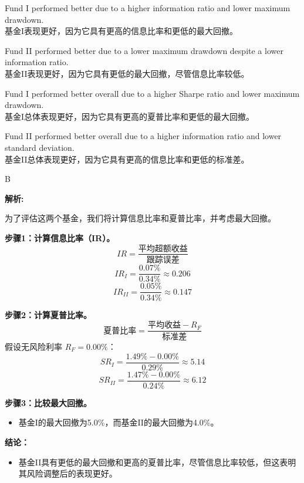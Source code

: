 \documentclass{article}
\newenvironment{explanation}
{\textbf{解析:}\par}
{\par}
\begin{document}
\begin{choices}
    \item Fund I performed better due to a higher information ratio and lower maximum drawdown.
    \\
    基金I表现更好，因为它具有更高的信息比率和更低的最大回撤。
    \item Fund II performed better due to a lower maximum drawdown despite a lower information ratio.
    \\
    基金II表现更好，因为它具有更低的最大回撤，尽管信息比率较低。
    \item Fund I performed better overall due to a higher Sharpe ratio and lower maximum drawdown.
    \\
    基金I总体表现更好，因为它具有更高的夏普比率和更低的最大回撤。
    \item Fund II performed better overall due to a higher information ratio and lower standard deviation.
    \\
    基金II总体表现更好，因为它具有更高的信息比率和更低的标准差。
\end{choices}

\begin{correctanswer}
    B
\end{correctanswer}

\begin{explanation}
    为了评估这两个基金，我们将计算信息比率和夏普比率，并考虑最大回撤。

    \textbf{步骤1：计算信息比率（IR）。}
    \[
    IR = \frac{\text{平均超额收益}}{\text{跟踪误差}}
    \]
    \[
    IR_{I} = \frac{0.07\%}{0.34\%} \approx 0.206
    \]
    \[
    IR_{II} = \frac{0.05\%}{0.34\%} \approx 0.147
    \]

    \textbf{步骤2：计算夏普比率。}
    \[
    \text{夏普比率} = \frac{\text{平均收益} - R_F}{\text{标准差}}
    \]
    假设无风险利率 \(R_F = 0.00\%\)：
    \[
    SR_{I} = \frac{1.49\% - 0.00\%}{0.29\%} \approx 5.14
    \]
    \[
    SR_{II} = \frac{1.47\% - 0.00\%}{0.24\%} \approx 6.12
    \]

    \textbf{步骤3：比较最大回撤。}
    \begin{itemize}
        \item 基金I的最大回撤为5.0\%，而基金II的最大回撤为4.0\%。
    \end{itemize}

    \textbf{结论：}
    \begin{itemize}
        \item 基金II具有更低的最大回撤和更高的夏普比率，尽管信息比率较低，但这表明其风险调整后的表现更好。
    \end{itemize}

\end{explanation}
\end{document}
